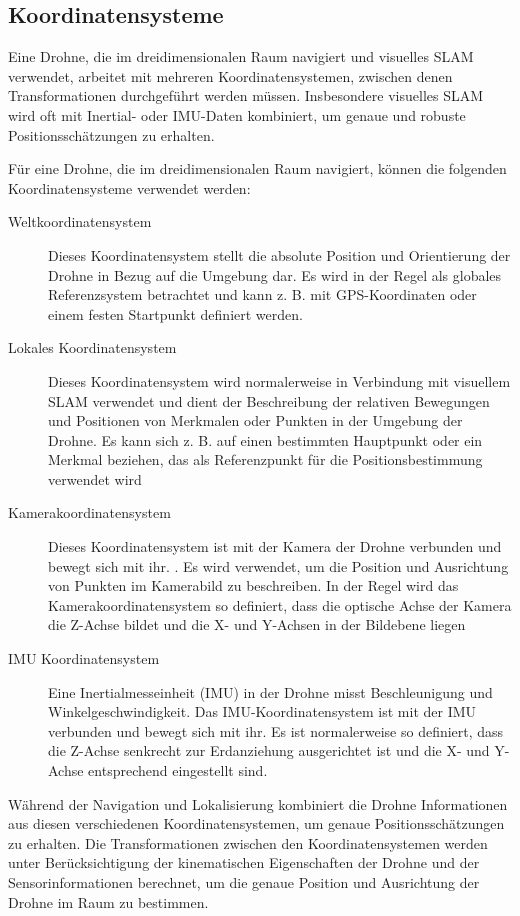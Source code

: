 \subsection{Koordinatensysteme}

Eine Drohne, die im dreidimensionalen Raum navigiert und visuelles SLAM verwendet, arbeitet mit mehreren Koordinatensystemen, zwischen denen Transformationen durchgeführt werden müssen. Insbesondere visuelles SLAM wird oft mit Inertial- oder IMU-Daten kombiniert, um genaue und robuste Positionsschätzungen zu erhalten.

Für eine Drohne, die im dreidimensionalen Raum navigiert, können die folgenden Koordinatensysteme verwendet werden:

\begin{description}
    \item[Weltkoordinatensystem]{Dieses Koordinatensystem stellt die absolute Position und Orientierung der Drohne in Bezug auf die Umgebung dar. Es wird in der Regel als globales Referenzsystem betrachtet und kann z. B. mit \ac{GPS}-Koordinaten oder einem festen Startpunkt definiert werden.}
    \item[Lokales Koordinatensystem]{Dieses Koordinatensystem wird normalerweise in Verbindung mit visuellem SLAM verwendet und dient der Beschreibung der relativen Bewegungen und Positionen von Merkmalen oder Punkten in der Umgebung der Drohne. Es kann sich z. B. auf einen bestimmten Hauptpunkt oder ein Merkmal beziehen, das als Referenzpunkt für die Positionsbestimmung verwendet wird}
    \item[Kamerakoordinatensystem]{
        Dieses Koordinatensystem ist mit der Kamera der Drohne verbunden und bewegt sich mit ihr. . Es wird verwendet, um die Position und Ausrichtung von Punkten im Kamerabild zu beschreiben. In der Regel wird das Kamerakoordinatensystem so definiert, dass die optische Achse der Kamera die Z-Achse bildet und die X- und Y-Achsen in der Bildebene liegen} 
    \item[\ac{IMU} Koordinatensystem]{Eine Inertialmesseinheit (IMU) in der Drohne misst Beschleunigung und Winkelgeschwindigkeit. Das IMU-Koordinatensystem ist mit der IMU verbunden und bewegt sich mit ihr. Es ist normalerweise so definiert, dass die Z-Achse senkrecht zur Erdanziehung ausgerichtet ist und die X- und Y-Achse entsprechend eingestellt sind.} 
\end{description}


Während der Navigation und Lokalisierung kombiniert die Drohne Informationen aus diesen verschiedenen Koordinatensystemen, um genaue Positionsschätzungen zu erhalten. Die Transformationen zwischen den Koordinatensystemen werden unter Berücksichtigung der kinematischen Eigenschaften der Drohne und der Sensorinformationen berechnet, um die genaue Position und Ausrichtung der Drohne im Raum zu bestimmen.


